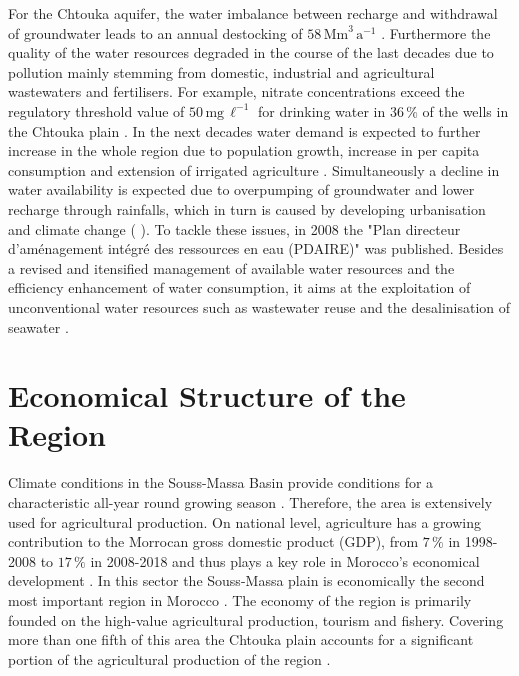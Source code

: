 For the Chtouka aquifer, the water imbalance between recharge and withdrawal of groundwater leads to an annual destocking of $58 \, \textrm{Mm}^3 \, \textrm{a}^{-1}$ \parencite{ABHSMD.2014}. Furthermore the quality of the water resources degraded in the course of the last decades due to pollution mainly stemming from domestic, industrial and agricultural wastewaters and fertilisers. For example, nitrate concentrations exceed the regulatory threshold value of $50 \, \textrm{mg} \, \ell^{-1}$ for drinking water in $36 \, \%$ of the wells in the Chtouka plain \parencite{Choukr.2017}. In the next decades water demand is expected to further increase in the whole region due to population growth, increase in per capita consumption and extension of irrigated agriculture \parencite{Choukr.2017}. Simultaneously a decline in water availability is expected due to overpumping of groundwater and lower recharge through rainfalls, which in turn is caused by developing urbanisation and climate change (\cite{Choukr.2017} \cite{Hssaisoune.2017}). To tackle these issues, in 2008 the "Plan directeur d'aménagement intégré des ressources en eau (PDAIRE)" was published. Besides a revised and itensified management of available water resources and the efficiency enhancement of water consumption, it aims at the exploitation of unconventional water resources such as wastewater reuse and the desalinisation of seawater \parencite{Choukr.2017}.

\section{Economical Structure of the Region}
\label{Sec-SouMaStructure}

Climate conditions in the Souss-Massa Basin provide conditions for a characteristic all-year round growing season \parencite{Hssaisoune.2017}. Therefore, the area is extensively used for agricultural production. On national level, agriculture has a growing contribution to the Morrocan gross domestic product (GDP), from $7 \, \%$ in 1998-2008 to $17 \, \%$ in 2008-2018 and thus plays a key role in Morocco's economical development \parencite{MarocVert.2021}. In this sector the Souss-Massa plain is economically the second most important region in Morocco \parencite{Choukr.2017}. The economy of the region is primarily founded on the high-value agricultural production, tourism and fishery. Covering more than one fifth of this area the Chtouka plain accounts for a significant portion of the agricultural production of the region \parencite{Choukr.2017}.

